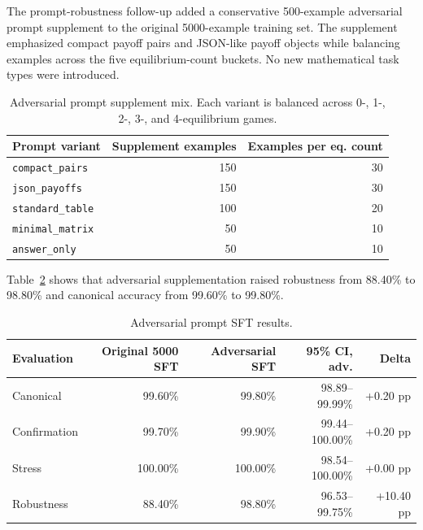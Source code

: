 \documentclass[11pt]{article}
\begin{document}
The prompt-robustness follow-up added a conservative 500-example adversarial prompt supplement to the original 5000-example training set. The supplement emphasized compact payoff pairs and JSON-like payoff objects while balancing examples across the five equilibrium-count buckets. No new mathematical task types were introduced.

\begin{table}[htbp]
\centering
\caption{Adversarial prompt supplement mix. Each variant is balanced across 0-, 1-, 2-, 3-, and 4-equilibrium games.}
\label{tab:adv-mix}
\begin{tabular}{lrr}
\toprule
Prompt variant & Supplement examples & Examples per eq. count \\
\midrule
\texttt{compact\_pairs} & 150 & 30 \\
\texttt{json\_payoffs} & 150 & 30 \\
\texttt{standard\_table} & 100 & 20 \\
\texttt{minimal\_matrix} & 50 & 10 \\
\texttt{answer\_only} & 50 & 10 \\
\bottomrule
\end{tabular}
\end{table}

Table~\ref{tab:adversarial} shows that adversarial supplementation raised robustness from 88.40\% to 98.80\% and canonical accuracy from 99.60\% to 99.80\%.

\begin{table}[htbp]
\centering
\caption{Adversarial prompt SFT results.}
\label{tab:adversarial}
\begin{tabular}{lrrrr}
\toprule
Evaluation & Original 5000 SFT & Adversarial SFT & 95\% CI, adv. & Delta \\
\midrule
Canonical & 99.60\% & 99.80\% & 98.89--99.99\% & +0.20 pp \\
Confirmation & 99.70\% & 99.90\% & 99.44--100.00\% & +0.20 pp \\
Stress & 100.00\% & 100.00\% & 98.54--100.00\% & +0.00 pp \\
Robustness & 88.40\% & 98.80\% & 96.53--99.75\% & +10.40 pp \\
\bottomrule
\end{tabular}
\end{table}
\end{document}
